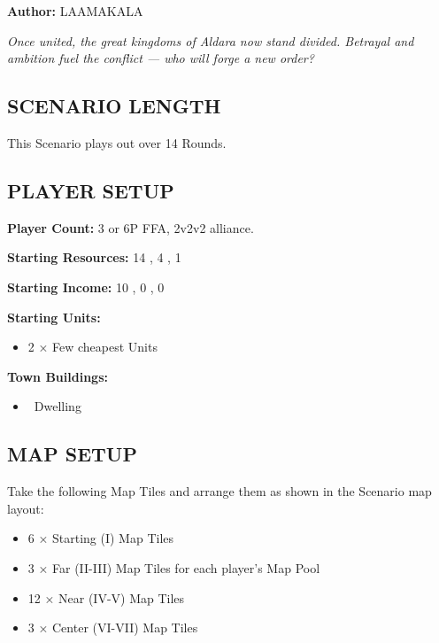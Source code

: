 
\begin{multicols*}{2}

\textbf{Author:} LAAMAKALA

\textit{Once united, the great kingdoms of Aldara now stand divided. Betrayal and ambition fuel the conflict — who will forge a new order?}  %

\subsection*{\MakeUppercase{Scenario Length}}
This Scenario plays out over 14 Rounds.

\subsection*{\MakeUppercase{Player Setup}}
\textbf{Player Count:} 3 or 6P FFA, 2v2v2 alliance.

\textbf{Starting Resources:} 14 , 4 , 1 

\textbf{Starting Income:} 10 , 0 , 0 

\textbf{Starting Units:}

\begin{itemize}
  \item 2 × Few cheapest  Units
\end{itemize}

\textbf{Town Buildings:}
\begin{itemize}
  \item \bronze\ Dwelling
\end{itemize}

\subsection*{\MakeUppercase{Map Setup}}
Take the following Map Tiles and arrange them as shown in the Scenario map layout:

\begin{itemize}
  \item 6 × Starting (I) Map Tiles
  \item 3 × Far (II-III) Map Tiles for each player's Map Pool
  \item 12 × Near (IV-V) Map Tiles
  \item 3 × Center (VI-VII) Map Tiles
\end{itemize}


\end{multicols*}
